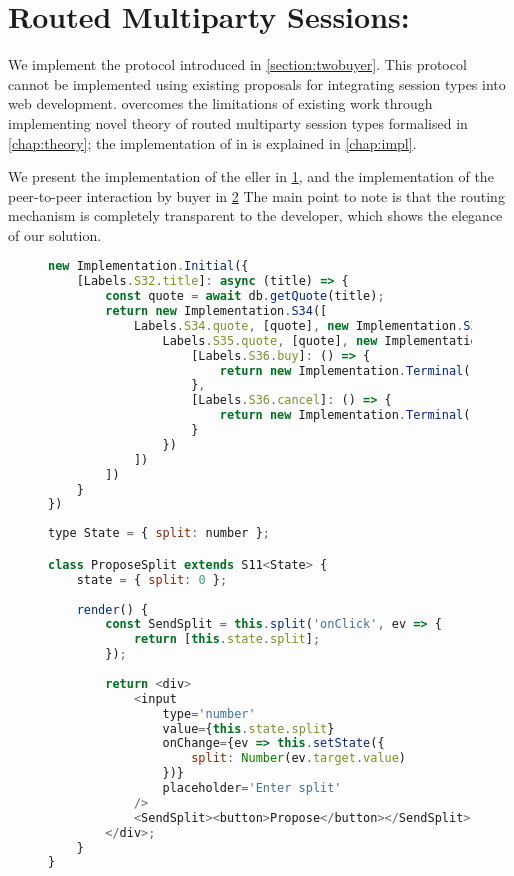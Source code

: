 \section{Routed Multiparty Sessions: }
\label{section:evaltwobuyer}

We implement the  protocol
introduced in \cref{section:twobuyer}. 
This protocol cannot be implemented using
existing proposals \cite{PureScript2019,MVU2020} for integrating
session types into web development.
\codegen overcomes the limitations of existing work
through implementing novel theory of routed multiparty
session types formalised in \cref{chap:theory};
the implementation of \newtheory in \codegen is 
explained in \cref{chap:impl}.

We present the implementation of the eller
in \cref{lst:evaltwobuyerseller}, 
and the implementation
of the peer-to-peer interaction by buyer 
in \cref{lst:evaltwobuyerA}
The main point to note is that the routing mechanism
is completely transparent to the developer,
which shows the elegance of our solution.

\begin{figure}[!h]
\begin{lstlisting}[language=javascript,tabsize=2]
new Implementation.Initial({
	[Labels.S32.title]: async (title) => {
		const quote = await db.getQuote(title);
		return new Implementation.S34([
			Labels.S34.quote, [quote], new Implementation.S35([
				Labels.S35.quote, [quote], new Implementation.S36({
					[Labels.S36.buy]: () => {
						return new Implementation.Terminal();
					},
					[Labels.S36.cancel]: () => {
						return new Implementation.Terminal();
					}
				})
			])
		])
	}
})
\end{lstlisting}
\label{lst:evaltwobuyerseller}
\end{figure}

\begin{figure}[!h]
\begin{lstlisting}[language=javascript]
type State = { split: number };

class ProposeSplit extends S11<State> {
	state = { split: 0 };
	
	render() {
		const SendSplit = this.split('onClick', ev => {
			return [this.state.split];		
		});
		
		return <div>
			<input
				type='number'
				value={this.state.split}
				onChange={ev => this.setState({
					split: Number(ev.target.value)
				})}
				placeholder='Enter split'
			/>
			<SendSplit><button>Propose</button></SendSplit>	
		</div>;	
	}
}
\end{lstlisting}
\label{lst:evaltwobuyerA}
\end{figure}

